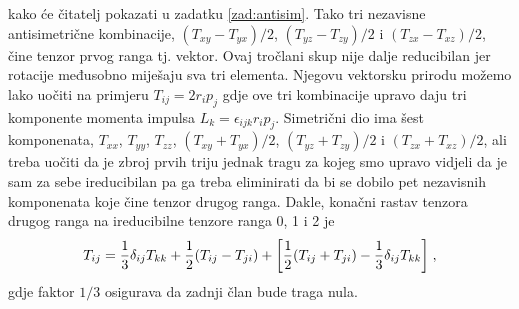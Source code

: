 kako će čitatelj pokazati u zadatku \ref{zad:antisim}.
Tako tri nezavisne antisimetrične kombinacije, $(T_{xy}-T_{yx})/2$,
$(T_{yz}-T_{zy})/2$ i $(T_{zx} - T_{xz})/2$, čine tenzor
prvog ranga tj. vektor.
Ovaj tročlani skup nije dalje reducibilan jer rotacije međusobno
miješaju sva tri elementa. Njegovu vektorsku prirodu možemo
lako uočiti na primjeru $T_{ij} = 2 r_i p_j$ gdje ove tri
kombinacije upravo daju tri komponente momenta impulsa 
$L_k = \epsilon_{ijk} r_i p_j$.
Simetrični dio ima šest komponenata, $T_{xx}$, $T_{yy}$, $T_{zz}$,
$(T_{xy}+T_{yx})/2$, $(T_{yz}+T_{zy})/2$ i $(T_{zx} + T_{xz})/2$, 
ali treba uočiti da je zbroj prvih triju jednak tragu za kojeg
smo upravo vidjeli da je sam za sebe ireducibilan 
pa ga treba eliminirati da bi se dobilo pet
nezavisnih komponenata koje čine tenzor drugog ranga.
Dakle, konačni rastav tenzora drugog ranga na
ireducibilne tenzore ranga 0, 1 i 2 je
\begin{equation}
T_{ij} = \frac{1}{3}\delta_{ij}T_{kk} +
  \frac{1}{2} (T_{ij} - T_{ji}) + 
 \bigg[\frac{1}{2} (T_{ij} + T_{ji}) - \frac{1}{3}\delta_{ij}T_{kk} \bigg] \;,
 \label{eq:Tijrastav}
\end{equation}
gdje faktor $1/3$ osigurava da zadnji član bude traga nula.

